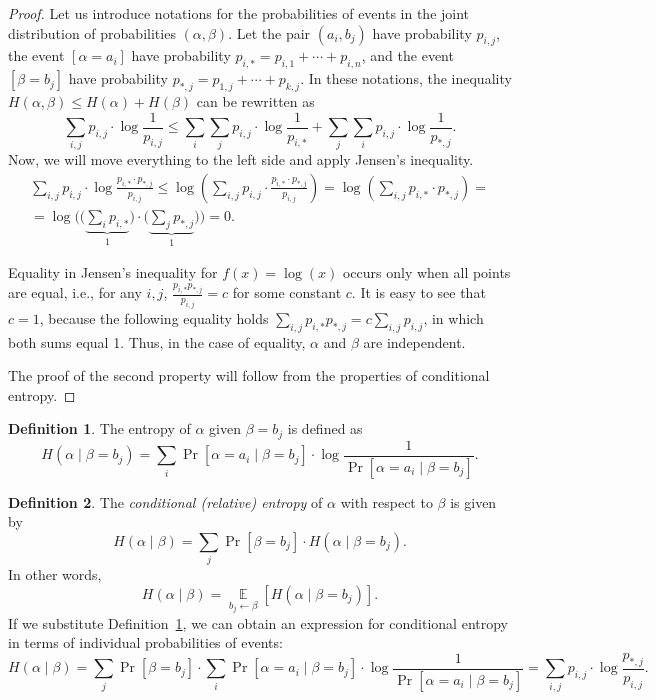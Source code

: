 \documentclass[12pt,sans]{article}
\DeclareMathOperator*{\E}{\mathbb{E}}
\theoremstyle{definition}
\newtheorem{definition}{Definition}[section]
\theoremstyle{plain}
\theoremstyle{remark}
\begin{document}
\begin{proof}
    Let us introduce notations for the probabilities of events in the joint distribution of probabilities \((\alpha, \beta)\). Let the pair \((a_i, b_j)\) have probability \(p_{i,j}\), the event \([\alpha = a_i]\) have probability \(p_{i,*} = p_{i,1} + \dotsb + p_{i,n}\), and the event \([\beta = b_j]\) have probability \(p_{*,j} = p_{1,j} + \dotsb + p_{k,j}\). In these notations, the inequality \(H(\alpha, \beta) \le H(\alpha) + H(\beta)\) can be rewritten as
    \[
    \sum_{i,j} p_{i,j} \cdot \log \frac{1}{p_{i,j}} \le
    \sum_{i} \sum_{j} p_{i,j} \cdot \log \frac{1}{p_{i,*}} +
    \sum_{j} \sum_{i} p_{i,j} \cdot \log \frac{1}{p_{*,j}}.
    \]
    Now, we will move everything to the left side and apply Jensen's inequality.
    \begin{multline*}
        \sum_{i,j} p_{i,j} \cdot \log \frac{p_{i,*} \cdot p_{*,j}}{p_{i,j}} \le
        \log\left(\sum_{i,j} p_{i,j} \cdot \frac{p_{i,*} \cdot p_{*,j}}{p_{i,j}}\right) =
        \log\left(\sum_{i,j} p_{i,*} \cdot p_{*,j}\right) = \\
        = \log \Biggl(\biggl(\underbrace{\sum_{i} p_{i,*}}_1\biggr) \cdot
        \biggl(\underbrace{\sum_{j} p_{*,j}}_1\biggr)\Biggr) = 0.
    \end{multline*}

    Equality in Jensen's inequality for \(f(x) = \log(x)\) occurs only when all points are equal, i.e., for any \(i,j\), \(\frac{p_{i,*} p_{*,j}}{p_{i,j}} = c\) for some constant \(c\). It is easy to see that \(c = 1\), because the following equality holds \(\sum_{i,j} {p_{i,*} p_{*,j}} = c \sum_{i,j} {p_{i,j}}\), in which both sums equal 1. Thus, in the case of equality, \(\alpha\) and \(\beta\) are independent.

    The proof of the second property will follow from the properties of conditional entropy.
\end{proof}


\begin{definition}\label{def:cond-entropy1}
    The entropy of \(\alpha\) given \(\beta = b_j\) is defined as
    \[
    H(\alpha\mid\beta = b_j) = \sum_i \Pr[\alpha = a_i\mid \beta = b_j] \cdot
    \log\frac{1}{\Pr[\alpha = a_i\mid \beta = b_j]}.
    \]
\end{definition}

\begin{definition}\label{def:cond-entropy2}
    The \emph{conditional (relative) entropy} of \(\alpha\) with respect to \(\beta\) is given by
    \[
    H(\alpha\mid\beta) = \sum_j \Pr[\beta = b_j] \cdot H(\alpha\mid \beta = b_j).
    \]
    In other words,
    \[
    H(\alpha\mid\beta) = \E\limits_{b_j \gets \beta}[H(\alpha\mid \beta = b_j)].
    \]
    If we substitute Definition~\ref{def:cond-entropy1}, we can obtain an expression for conditional entropy in terms of individual probabilities of events:
    \[
    H(\alpha\mid\beta) =
    \sum_j \Pr[\beta = b_j] \cdot
    \sum_i \Pr[\alpha = a_i\mid \beta = b_j] \cdot
    \log\frac{1}{\Pr[\alpha = a_i\mid \beta = b_j]}  =
    \sum_{i,j} p_{i,j} \cdot \log\frac{p_{*,j}}{p_{i,j}}.
    \]
\end{definition}
\end{document}
